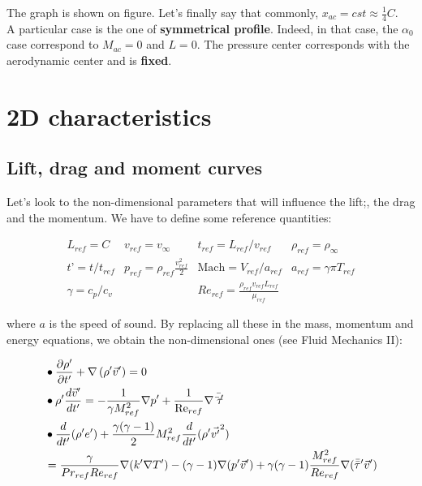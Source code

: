 		 	The graph is shown on figure. Let's finally say that commonly, $x_{ac} = cst \approx \frac{1}{4}C$.\\
		 	
		 	 A particular case is the one of \textbf{symmetrical profile}. Indeed, in that case, the $\alpha _0$ case correspond to $M_{ac} = 0$ and $L=0$. The pressure center corresponds with the aerodynamic center and is \textbf{fixed}.  
		 	 
	\section{2D characteristics}
		\subsection{Lift, drag and moment curves}
			Let’s look to the non-dimensional parameters that will influence the lift;, the drag and the momentum. We have to define some reference quantities: 

			\begin{equation}
			\begin{array}{cccc}
			L_{ref} = C & v_{ref} = v_\infty & t_{ref} = L_{ref}/v_{ref} & \rho _{ref} = \rho _\infty \\
			t’= t/t_{ref} & p_{ref} = \rho _{ref} \frac{v_{ref} ^2}{2} & \mbox{Mach} = V_{ref} / a_{ref} & a_{ref} = \gamma \pi T_{ref} \\
			\gamma = c_p / c_v && Re_{ref} = \frac{\rho _{ref} v_{ref} L_{ref}}{\mu _{ref}} &
			\end{array}
			\end{equation}					
			
			where $a$ is the speed of sound. By replacing all these in the mass, momentum and energy equations, we obtain the non-dimensional ones (see Fluid Mechanics II):
			
			\begin{equation}
			\begin{aligned}
			&\bullet\frac{\partial \rho '}{\partial t'} + \nabla \left(\rho ' \vec{v}'\right) = 0\\
			&\bullet\rho ' \frac{d\vec{v}'}{dt'} = - \frac{1}{\gamma M^2_{ref}}\nabla p' + \frac{1}{\mbox{Re}_{ref}}\nabla \bar{\bar{\tau}'}\\
			&\bullet\frac{d}{dt'}(\rho ' e')+ \frac{\gamma (\gamma -1)}{2} M^2_{ref}\frac{d}{dt'}(\rho ' \vec{v'}^2 ) \\
			&= \frac{\gamma}{Pr_{ref}Re_{ref}} \nabla (k'\nabla T') - (\gamma -1)\nabla (p'\vec{v}')+ \gamma (\gamma -1) \frac{M_{ref}^2}{Re_{ref}} \nabla (\bar{\bar{\tau}}'\vec{v}')			\end{aligned}
			\end{equation}
		
